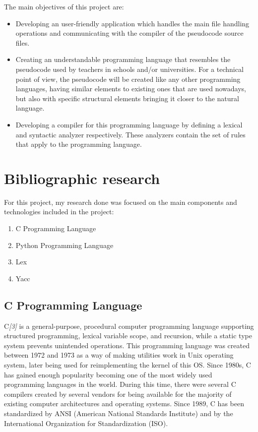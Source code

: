 \documentclass[12pt,a4paper,twoside]{report}
\begin{document}
The main objectives of this project are:
\begin{itemize}
	\item Developing an user-friendly application which handles the main file handling operations and communicating with the compiler of the pseudocode source files.
	\item Creating an understandable programming language that resembles the pseudocode used by teachers in schools and/or universities. For a technical point of view, the pseudocode will be created like any other programming languages, having similar elements to existing ones that are used nowadays, but also with specific structural elements bringing it closer to the natural language.
	\item Developing a compiler for this programming language by defining a lexical and syntactic analyzer respectively. These analyzers contain the set of rules that apply to the programming language. 
\end{itemize}





\chapter{Bibliographic research}

For this project, my research done was focused on the main components and technologies included in the project:
\begin{enumerate}\bfseries
	\item C Programming Language
	\item Python Programming Language
	\item Lex
	\item Yacc
\end{enumerate}
 
\section{C Programming Language}
 C{\it[3]} is a general-purpose, procedural computer programming language supporting structured programming, lexical variable scope, and recursion, while a static type system prevents unintended operations. This programming language was created between 1972 and 1973 as a way of making utilities work in Unix operating system, later being used for reimplementing the kernel of this OS. Since 1980s, C has gained enough popularity becoming one of the most widely used programming languages in the world. During this time, there were several C compilers created by several vendors for being available for the majority of existing computer architectures and operating systems. Since 1989, C has been standardized by ANSI (American National Standards Institute) and by the International Organization for Standardization (ISO). 
  
\end{document}
